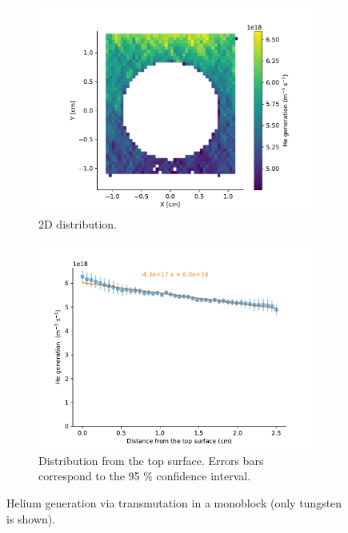 \begin{figure}
    \centering
    \begin{subfigure}{0.5\linewidth}
        \includegraphics[width=\linewidth]{Figures/Chapter5/helium_transmutation_in_monoblock.pdf}
        \caption{2D distribution.}
    \end{subfigure}%
    \begin{subfigure}{0.5\linewidth}
        \includegraphics[width=\linewidth]{Figures/Chapter5/he_generation_distribution.pdf}
        \caption{Distribution from the top surface. Errors bars correspond to the 95 \% confidence interval.}
    \end{subfigure}
    \caption{Helium generation via transmutation in a \gls{monoblock} (only tungsten is shown).}
\end{figure}

